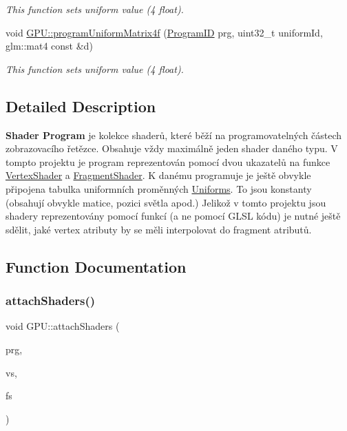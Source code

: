 \begin{DoxyCompactItemize}
\begin{DoxyCompactList}\small\item\em This function sets uniform value (4 float). \end{DoxyCompactList}\item 
void \hyperlink{group__program__tasks_gac3b490a674226c0510ac3c0b784010fa}{G\+P\+U\+::program\+Uniform\+Matrix4f} (\hyperlink{fwd_8hpp_a46ffd067c21ab50f5f1fcfed5d8bfc15}{Program\+ID} prg, uint32\+\_\+t uniform\+Id, glm\+::mat4 const \&d)
\begin{DoxyCompactList}\small\item\em This function sets uniform value (4 float). \end{DoxyCompactList}\end{DoxyCompactItemize}


\subsection{Detailed Description}
{\bfseries Shader Program} je kolekce shaderů, které běží na programovatelných částech zobrazovacího řetězce. Obsahuje vždy maximálně jeden shader daného typu. V tompto projektu je program reprezentován pomocí dvou ukazatelů na funkce \hyperlink{fwd_8hpp_af647cdb302d7e978c6a0da41a0a92725}{Vertex\+Shader} a \hyperlink{fwd_8hpp_a52f1704ae0b129e49fe1902e05319ad6}{Fragment\+Shader}. K danému programuje je ještě obvykle připojena tabulka uniformních proměnných \hyperlink{structUniforms}{Uniforms}. To jsou konstanty (obsahují obvykle matice, pozici světla apod.) Jelikož v tomto projektu jsou shadery reprezentovány pomocí funkcí (a ne pomocí G\+L\+SL kódu) je nutné ještě sdělit, jaké vertex atributy by se měli interpolovat do fragment atributů. 

\subsection{Function Documentation}
\mbox{\label{group__program__tasks_gafe72b55028369d1e9e9f8d087c76af09}} 
\subsubsection{\texorpdfstring{attach\+Shaders()}{attachShaders()}}
{\footnotesize\ttfamily void G\+P\+U\+::attach\+Shaders (\begin{DoxyParamCaption}\item[{\hyperlink{fwd_8hpp_a46ffd067c21ab50f5f1fcfed5d8bfc15}{Program\+ID}}]{prg,  }\item[{\hyperlink{fwd_8hpp_af647cdb302d7e978c6a0da41a0a92725}{Vertex\+Shader}}]{vs,  }\item[{\hyperlink{fwd_8hpp_a52f1704ae0b129e49fe1902e05319ad6}{Fragment\+Shader}}]{fs }\end{DoxyParamCaption})}




